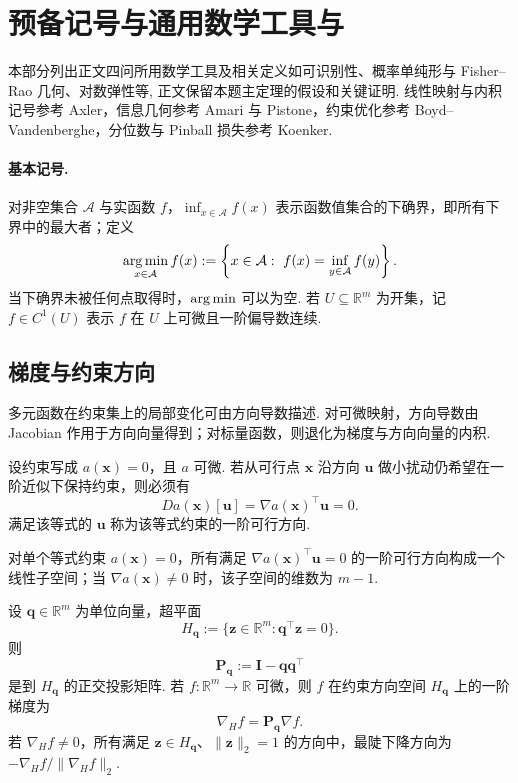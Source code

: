 \section{预备记号与通用数学工具与}\label{sec:math-background}

本部分列出正文四问所用数学工具及相关定义如可识别性、概率单纯形与 Fisher--Rao 几何、对数弹性等, 正文保留本题主定理的假设和关键证明. 线性映射与内积记号参考 Axler\cite{axler}，信息几何参考 Amari 与 Pistone\cite{amari2016,pistone}，约束优化参考 Boyd--Vandenberghe\cite{boyd}，分位数与 Pinball 损失参考 Koenker\cite{koenker}. 

\paragraph{基本记号. \quad}
对非空集合 $\mathcal A$ 与实函数 $f$，$\inf_{x\in\mathcal A}f(x)$ 表示函数值集合的下确界，即所有下界中的最大者；定义
\[
\operatorname*{arg\,min}_{x\in\mathcal A}f(x)
:=\left\{x\in\mathcal A:\ f(x)=\inf_{y\in\mathcal A}f(y)\right\}.
\]
当下确界未被任何点取得时，$\operatorname*{arg\,min}$ 可以为空. 若 $U\subseteq\mathbb R^m$ 为开集，记 $f\in C^1(U)$ 表示 $f$ 在 $U$ 上可微且一阶偏导数连续. 

\subsection{梯度与约束方向}\label{sec:bg-differential}

多元函数在约束集上的局部变化可由方向导数描述. 对可微映射，方向导数由 Jacobian 作用于方向向量得到；对标量函数，则退化为梯度与方向向量的内积. 

\begin{definition}[一阶可行方向]\label{def:bg-feasible-direction}
设约束写成 $a(\mathbf x)=0$，且 $a$ 可微. 若从可行点 $\mathbf x$ 沿方向 $\mathbf u$ 做小扰动仍希望在一阶近似下保持约束，则必须有
\[
Da(\mathbf x)[\mathbf u]=\nabla a(\mathbf x)^\top\mathbf u=0.
\]
满足该等式的 $\mathbf u$ 称为该等式约束的一阶可行方向. 
\end{definition}

对单个等式约束 $a(\mathbf x)=0$，所有满足 $\nabla a(\mathbf x)^\top\mathbf u=0$ 的一阶可行方向构成一个线性子空间；当 $\nabla a(\mathbf x)\neq0$ 时，该子空间的维数为 $m-1$. 


\begin{proposition}[正交投影与约束梯度]\label{prop:bg-orthogonal-projection}
设 $\mathbf q\in\mathbb R^m$ 为单位向量，超平面
\[
H_{\mathbf q}:=\{\mathbf z\in\mathbb R^m:\mathbf q^\top\mathbf z=0\}.
\]
则
\[
\mathbf P_{\mathbf q}:=\mathbf I-\mathbf q\mathbf q^\top
\]
是到 $H_{\mathbf q}$ 的正交投影矩阵. 若 $f:\mathbb R^m\to\mathbb R$ 可微，则 $f$ 在约束方向空间 $H_{\mathbf q}$ 上的一阶梯度为
\begin{equation}\label{eq:bg-projected-gradient}
\nabla_H f=\mathbf P_{\mathbf q}\nabla f.
\end{equation}
若 $\nabla_H f\neq0$，所有满足 $\mathbf z\in H_{\mathbf q}$、$\|\mathbf z\|_2=1$ 的方向中，最陡下降方向为 $-\nabla_H f/\|\nabla_H f\|_2$. 
\end{proposition}

